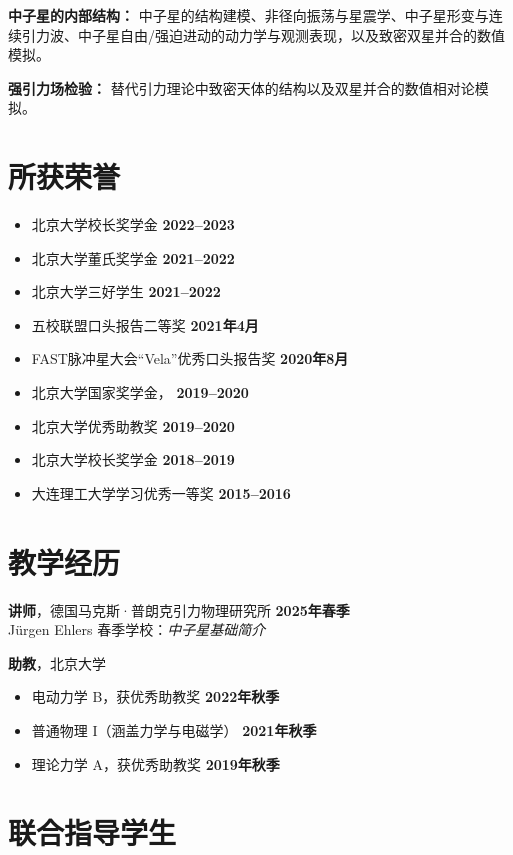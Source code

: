 \documentclass[margin,line]{res_mod}
\begin{document}
\begin{resume}
\textbf{中子星的内部结构：} 中子星的结构建模、非径向振荡与星震学、中子星形变与连续引力波、中子星自由/强迫进动的动力学与观测表现，以及致密双星并合的数值模拟。

\textbf{强引力场检验：} 替代引力理论中致密天体的结构以及双星并合的数值相对论模拟。

\section{所获荣誉}
\begin{itemize}
  \item 北京大学校长奖学金 \hfill \textbf{2022–2023}
  \item 北京大学董氏奖学金 \hfill \textbf{2021–2022}
  \item 北京大学三好学生 \hfill \textbf{2021–2022}
  \item 五校联盟口头报告二等奖 \hfill \textbf{2021年4月}
  \item FAST脉冲星大会“Vela”优秀口头报告奖 \hfill \textbf{2020年8月}
  \item 北京大学国家奖学金， \hfill \textbf{2019–2020}
  \item 北京大学优秀助教奖 \hfill \textbf{2019–2020}
  \item 北京大学校长奖学金 \hfill \textbf{2018–2019}
  \item 大连理工大学学习优秀一等奖 \hfill \textbf{2015–2016}
\end{itemize}


\section{教学经历}

\textbf{讲师}，德国马克斯·普朗克引力物理研究所 \hfill \textbf{2025年春季} \\
Jürgen Ehlers 春季学校：\textit{中子星基础简介}

\vspace{0.8em}

\textbf{助教}，北京大学
\begin{itemize}
  \item 电动力学 B，获优秀助教奖 \hfill \textbf{2022年秋季}
  \item 普通物理 I（涵盖力学与电磁学） \hfill \textbf{2021年秋季}
  \item 理论力学 A，获优秀助教奖 \hfill \textbf{2019年秋季}
\end{itemize}



\section{联合指导学生}


\end{resume}
\end{document}
